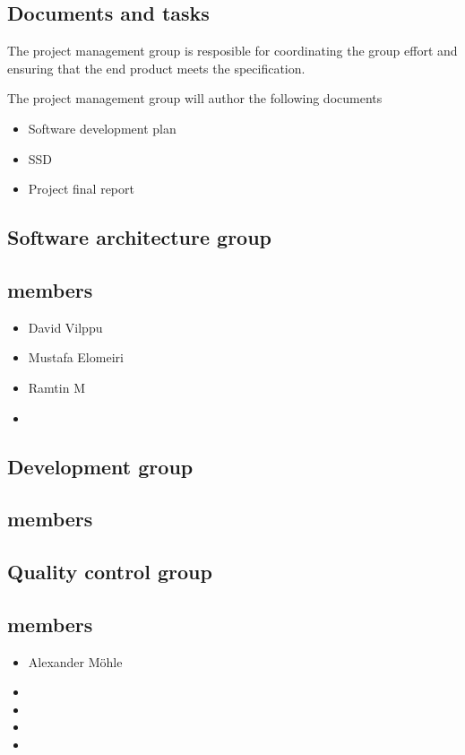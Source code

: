 \documentclass{article}
\begin{document}
        \subsection{Documents and tasks}
            The project management group is resposible for coordinating the group effort and ensuring that the end product meets the specification. 
            
            The project management group will author the following documents
            \begin{itemize}
                \item Software development plan
                \item SSD
                \item Project final report
            \end{itemize}
    
    \subsection{Software architecture group}
        \subsection{members}
            \begin{itemize}
                \item David Vilppu
                \item Mustafa Elomeiri
                \item Ramtin M
                \item 
            \end{itemize}
            
    \subsection{Development group}
        \subsection{members}
   
    \subsection{Quality control group}
        \subsection{members}
            \begin{itemize}
                \item Alexander Möhle
                \item
                \item
                \item
                \item
            \end{itemize}
\end{document}

